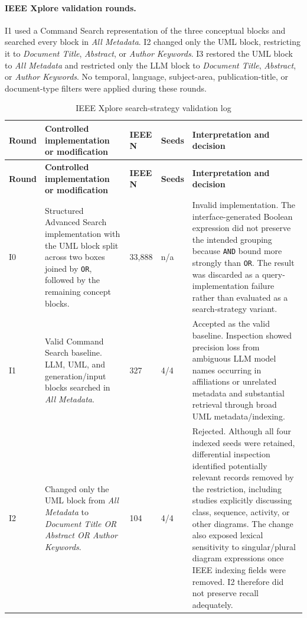 \paragraph{IEEE Xplore validation rounds.}
I1 used a Command Search representation of the three conceptual blocks and
searched every block in \emph{All Metadata}. I2 changed only the UML block,
restricting it to \emph{Document Title}, \emph{Abstract}, or \emph{Author
Keywords}. I3 restored the UML block to \emph{All Metadata} and restricted only
the LLM block to \emph{Document Title}, \emph{Abstract}, or \emph{Author
Keywords}. No temporal, language, subject-area, publication-title, or document-type
filters were applied during these rounds.

\begin{longtable}{p{} p{} p{} p{} p{}}
\caption{IEEE Xplore search-strategy validation log}
\label{tab:ieee_validation_rounds}\\
\toprule
\textbf{Round} & \textbf{Controlled implementation or modification} & \textbf{IEEE N} & \textbf{Seeds} & \textbf{Interpretation and decision} \\
\midrule
\endfirsthead
\toprule
\textbf{Round} & \textbf{Controlled implementation or modification} & \textbf{IEEE N} & \textbf{Seeds} & \textbf{Interpretation and decision} \\
\midrule
\endhead
I0 & Structured Advanced Search implementation with the UML block split across two boxes joined by \texttt{OR}, followed by the remaining concept blocks. & 33,888 & n/a & Invalid implementation. The interface-generated Boolean expression did not preserve the intended grouping because \texttt{AND} bound more strongly than \texttt{OR}. The result was discarded as a query-implementation failure rather than evaluated as a search-strategy variant. \\
I1 & Valid Command Search baseline. LLM, UML, and generation/input blocks searched in \emph{All Metadata}. & 327 & 4/4 & Accepted as the valid baseline. Inspection showed precision loss from ambiguous LLM model names occurring in affiliations or unrelated metadata and substantial retrieval through broad UML metadata/indexing. \\
I2 & Changed only the UML block from \emph{All Metadata} to \emph{Document Title OR Abstract OR Author Keywords}. & 104 & 4/4 & Rejected. Although all four indexed seeds were retained, differential inspection identified potentially relevant records removed by the restriction, including studies explicitly discussing class, sequence, activity, or other diagrams. The change also exposed lexical sensitivity to singular/plural diagram expressions once IEEE indexing fields were removed. I2 therefore did not preserve recall adequately. \\

\end{longtable}
